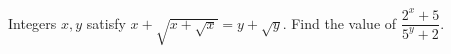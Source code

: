 Integers $x, y$ satisfy $x+\sqrt{x+\sqrt{x}}=y+\sqrt{y}$. Find the value of $\dfrac{2^{x}+5}{5^{y}+2}$.

